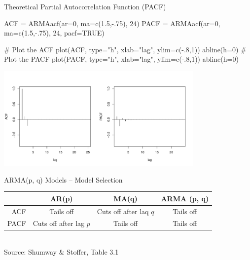 \documentclass[ignorenonframetext,xcolor=x11names]{beamer}
\begin{document}
\begin{frame}[fragile]{Theoretical Partial Autocorrelation Function (PACF)}
\begin{Rcode}
ACF  = ARMAacf(ar=0, ma=c(1.5,-.75), 24)
PACF = ARMAacf(ar=0, ma=c(1.5,-.75), 24, pacf=TRUE)

# Plot the ACF
plot(ACF, type="h", xlab="lag", ylim=c(-.8,1))
abline(h=0)
# Plot the PACF
plot(PACF, type="h", xlab="lag", ylim=c(-.8,1))
abline(h=0)
\end{Rcode}
\vspace{-2\baselineskip}
\begin{center}
\includegraphics[height=2in]{figure20a.pdf}
\end{center}
\end{frame}


\begin{frame}{ARMA(p, q) Models -- Model Selection}
\small
\renewcommand{\arraystretch}{1.5}
\begin{tabular}{r|c|c|c} \hline
 & AR(p) & MA(q) & ARMA (p, q) \\ \hline
 ACF & Tails off & Cuts off after laq $q$ & Tails off \\
 PACF & Cuts off after lag $p$ & Tails off & Tails off \\ \hline
\end{tabular} \\

\vspace{\baselineskip}
\scriptsize Source: Shumway \& Stoffer, Table 3.1 \normalsize
\end{frame}
\end{document}
